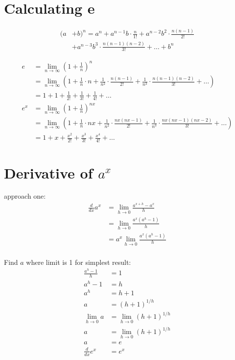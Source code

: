 \documentclass[letterpaper, landscape]{exam}
\begin{document}
  \section{Calculating e} %
  
  \begin{align*}
    (a & + b)^n = a^n + a^{n - 1} b \cdot \frac{n}{1!} + a^{n - 2} b^2 \cdot \frac{n(n - 1)}{2!} \\
       & + a^{n - 3} b^3 \cdot \frac{n(n - 1)(n - 2)}{3!} + \ldots + b^n
  \end{align*}

  \begin{align*}
    e &= \lim_{n \to \infty} \left( 1 + \frac{1}{n} \right)^n \\
      & = \lim_{n \to \infty} \left( 1 + \frac{1}{n} \cdot n + \frac{1}{n^2} \cdot \frac{n(n - 1)}{2!} 
        + \frac{1}{n^3} \cdot \frac{n(n - 1)(n - 2)}{3!} + \ldots \right) \\
      & = 1 + 1 + \frac{1}{2!} + \frac{1}{3!} + \frac{1}{4!} + \ldots
    \\
    e^x &= \lim_{n \to \infty} \left( 1 + \frac{1}{n} \right)^{nx} \\
      & = \lim_{n \to \infty} \left( 1 + \frac{1}{n} \cdot nx + \frac{1}{n^2} \cdot \frac{nx(nx - 1)}{2!} 
        + \frac{1}{n^3} \cdot \frac{nx(nx - 1)(nx - 2)}{3!} + \ldots \right) \\
      & = 1 + x + \frac{x^2}{2!} + \frac{x^3}{3!} + \frac{x^4}{4!} + \ldots
  \end{align*}

  \section{Derivative of $a^x$} %

  approach one:
  \begin{align*}
    \frac{d}{dx} a^x & = \lim_{h \to 0} \frac{a^{x + h} - a^x}{h} \\
                     & = \lim_{h \to 0} \frac{a^x \left( a^h - 1 \right)}{h} \\
                     & = a^x \lim_{h \to 0} \frac{a^x \left( a^h - 1 \right)}{h} \\
  \end{align*}

  Find $a$ where limit is 1 for simplest result:
  \begin{align*}
    \frac{a^h - 1}{h} & = 1 \\
    a^h - 1           & = h \\
    a^h               & = h + 1 \\
    a                 & = \left( h + 1 \right)^{1/h} \\
    \lim_{h \to 0} a  & = \lim_{h \to 0} \left( h + 1 \right)^{1/h} \\
    a                 & = \lim_{h \to 0} \left( h + 1 \right)^{1/h} \\
    a                 & = e \\
    \frac{d}{dx} e^x  & = e^x \\
  \end{align*}
\end{document}
